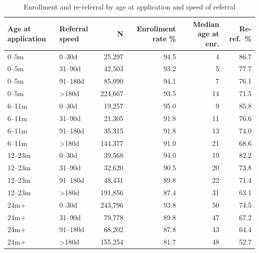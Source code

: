 \begin{table}[htbp]\centering
\caption{Enrollment and re-referral by age at application and speed of referral}
\label{tab:C4}
\footnotesize
\begin{tabular}{llrrrr}
\toprule
Age at application & Referral speed & N & Enrollment rate \% & Median age at enr. & Re-ref.\ \% \\
\midrule
0--5m & 0--30d & 25,297 & 94.5 & 4 & 86.7 \\
0--5m & 31--90d & 42,503 & 93.2 & 5 & 77.7 \\
0--5m & 91--180d & 85,090 & 94.1 & 7 & 76.1 \\
0--5m & >180d & 224,667 & 93.5 & 14 & 71.5 \\
6--11m & 0--30d & 19,257 & 95.0 & 9 & 85.8 \\
6--11m & 31--90d & 21,305 & 91.8 & 11 & 76.6 \\
6--11m & 91--180d & 35,315 & 91.8 & 13 & 74.0 \\
6--11m & >180d & 144,377 & 91.0 & 21 & 68.6 \\
12--23m & 0--30d & 39,568 & 94.0 & 19 & 82.2 \\
12--23m & 31--90d & 32,620 & 90.5 & 20 & 73.8 \\
12--23m & 91--180d & 48,431 & 89.8 & 22 & 71.4 \\
12--23m & >180d & 191,856 & 87.4 & 31 & 63.1 \\
24m+ & 0--30d & 243,796 & 93.8 & 50 & 74.5 \\
24m+ & 31--90d & 79,778 & 89.8 & 47 & 67.2 \\
24m+ & 91--180d & 68,202 & 87.8 & 43 & 64.4 \\
24m+ & >180d & 155,254 & 81.7 & 48 & 52.7 \\
\bottomrule
\end{tabular}
\end{table}
